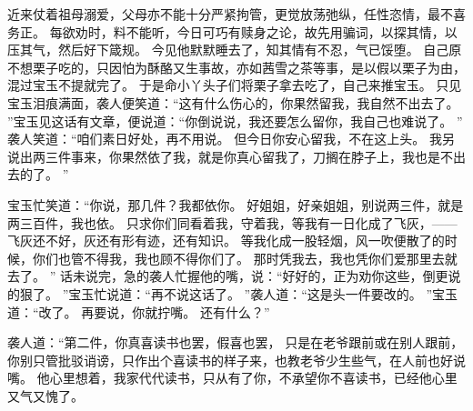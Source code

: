 近来仗着祖母溺爱，父母亦不能十分严紧拘管，更觉放荡弛纵，任性恣情，最不喜务正。
每欲劝时，料不能听，今日可巧有赎身之论，故先用骗词，以探其情，以压其气，然后好下箴规。
今见他默默睡去了，知其情有不忍，气已馁堕。
自己原不想栗子吃的，只因怕为酥酪又生事故，亦如茜雪之茶等事，是以假以栗子为由，混过宝玉不提就完了。
于是命小丫头子们将栗子拿去吃了，自己来推宝玉。
只见宝玉泪痕满面，袭人便笑道：“这有什么伤心的，你果然留我，我自然不出去了。
”宝玉见这话有文章，便说道：“你倒说说，我还要怎么留你，我自己也难说了。
”
袭人笑道：“咱们素日好处，再不用说。
但今日你安心留我，不在这上头。
我另说出两三件事来，你果然依了我，就是你真心留我了，刀搁在脖子上，我也是不出去的了。
”\par
宝玉忙笑道：“你说，那几件？我都依你。
好姐姐，好亲姐姐，别说两三件，就是两三百件，我也依。
只求你们同看着我，守着我，等我有一日化成了飞灰，——飞灰还不好，灰还有形有迹，还有知识。
等我化成一股轻烟，风一吹便散了的时候，你们也管不得我，我也顾不得你们了。
那时凭我去，我也凭你们爱那里去就去了。
”
话未说完，急的袭人忙握他的嘴，说：“好好的，正为劝你这些，倒更说的狠了。
”宝玉忙说道：“再不说这话了。
”袭人道：“这是头一件要改的。
”宝玉道：“改了。
再要说，你就拧嘴。
还有什么？”\par
袭人道：“第二件，你真喜读书也罢，假喜也罢，
只是在老爷跟前或在别人跟前，你别只管批驳诮谤，只作出个喜读书的样子来，也教老爷少生些气，在人前也好说嘴。
他心里想着，我家代代读书，只从有了你，不承望你不喜读书，已经他心里又气又愧了。
